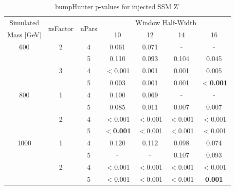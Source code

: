 \begin{table}[!ht]
\centering
\begin{tabular}{|c|c|c||c|c|c|c|}
\hline
       Simulated      & \multirow{2}{*}{xsFactor} & \multirow{2}{*}{nPars} &\multicolumn{4}{c|}{Window Half-Width} \\ \cline{4-7} 
      Mass [GeV]      &                           &                        &      10        &      12        &      14        &      16        \\ \hline
        600           &            2              &           4            &   0.061    &   0.071    &     -      &     -      \\
                      &                           &           5            &   0.110    &   0.093    &   0.104    &   0.045    \\ \cline{2-7}
                      &            3              &           4            &   $<$0.001 &   0.001    &   0.001    &   0.005    \\
                      &                           &           5            &   0.003    &   0.001    &   0.001    &  \textbf{$<$0.001} \\ \hline
        800           &            1              &           4            &   0.100    &   0.069    &     -      &     -      \\
                      &                           &           5            &   0.085    &   0.011    &   0.007    &   0.007    \\ \cline{2-7}
                      &            2              &           4            &   $<$0.001 &   $<$0.001 &   $<$0.001 &   $<$0.001  \\
                      &                           &           5            &   \textbf{$<$0.001} &   $<$0.001 &   $<$0.001 &   $<$0.001  \\ \hline
       1000           &            1              &           4            &   0.120    &   0.112    &   0.098    &   0.074    \\
                      &                           &           5            &     -      &     -      &   0.107    &   0.093    \\ \cline{2-7}
                      &            2              &           4            &   $<$0.001 &   $<$0.001 &   $<$0.001 &   $<$0.001  \\
                      &                           &           5            &   $<$0.001 &   $<$0.001 &   $<$0.001 &   \textbf{0.001}    \\
\hline
\end{tabular}
\vspace{10pt}
\caption{\label{tab:bumpH_lm_sigInj}  bumpHunter p-values for injected SSM Z' }
\end{table}



